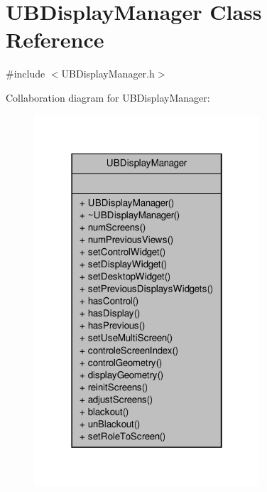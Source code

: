 \hypertarget{class_u_b_display_manager}{\section{U\-B\-Display\-Manager Class Reference}
\label{dd/d0f/class_u_b_display_manager}
}


{\ttfamily \#include $<$U\-B\-Display\-Manager.\-h$>$}



Collaboration diagram for U\-B\-Display\-Manager\-:
\nopagebreak
\begin{figure}[H]
\begin{center}
\leavevmode
\includegraphics[width=238pt]{d2/d6d/class_u_b_display_manager__coll__graph}
\end{center}
\end{figure}
